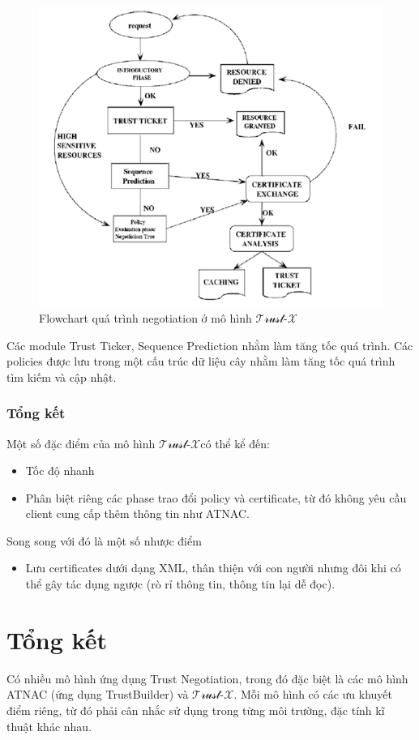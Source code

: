 \documentclass[12pt]{article}
\newcommand{\trustx}{$\mathcal{\text{Trust-}X}$}
\begin{document}
\begin{figure}[H]
\centering
\includegraphics[scale=.8]{img/trustx-architecture.png}
\caption{Flowchart quá trình negotiation ở mô hình \trustx}
\end{figure}

Các module Trust Ticker, Sequence Prediction nhằm làm tăng tốc quá trình. Các policies được lưu trong một cấu trúc dữ liệu cây nhằm làm tăng tốc quá trình tìm kiếm và cập nhật.

\subsubsection{Tổng kết}
Một số đặc điểm của mô hình \trustx có thể kể đến:
\begin{itemize}
\item Tốc độ nhanh
\item Phân biệt riêng các phase trao đổi policy và certificate, từ đó không yêu cầu client cung cấp thêm thông tin như ATNAC.
\end{itemize}
Song song với đó là một số nhược điểm
\begin{itemize}
\item Lưu certificates dưới dạng XML, thân thiện với con người nhưng đôi khi có thể gây tác dụng ngược (rò rỉ thông tin, thông tin lại dễ đọc).
\end{itemize}

\section{Tổng kết}
Có nhiều mô hình ứng dụng Trust Negotiation, trong đó đặc biệt là các mô hình ATNAC (ứng dụng TrustBuilder) và \trustx. Mỗi mô hình có các ưu khuyết điểm riêng, từ đó phải cân nhắc sử dụng trong từng môi trường, đặc tính kĩ thuật khác nhau.



\end{document}
